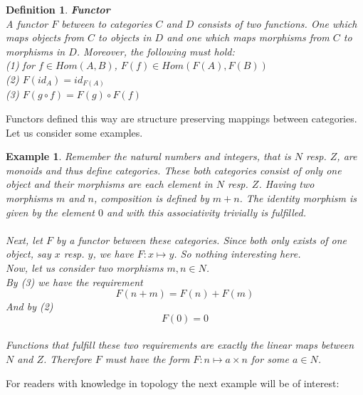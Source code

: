 \documentclass[17pt]{extarticle}
\newtheorem{example}{Example}
\newtheorem*{definition*}{Definition}
\begin{document}
\begin{definition*}
	\textbf{Functor}\\
	A functor $F$ between to categories $C$ and $D$ consists of two functions.
	One which maps objects from $C$ to objects in $D$ and one which maps morphisms from
	$C$ to morphisms in $D$. Moreover, the following must hold:\\
	(1) for $f\in Hom(A,B)$, $F(f)\in Hom(F(A), F(B))$\\
	(2) $F(id_A)=id_{F(A)}$\\
	(3) $F(g\circ f)=F(g)\circ F(f)$
\end{definition*}
\leavevmode\newline
Functors defined this way are structure preserving mappings between categories.
Let us consider some examples.\\

\begin{example}
	Remember the natural numbers and integers, that is $N$ resp. $Z$, are monoids and thus define categories. These both categories consist of only one object and their morphisms are each element in $N$ resp. $Z$. Having two morphisms $m$ and $n$, composition is defined by $m+n$. The identity morphism is given by the element $0$ and with this associativity trivially is fulfilled.\\ \\
	 
    Next, let $F$ by a functor between these categories. Since both only exists of one object, say $x$ resp. $y$, we have $F: x\mapsto y$. So nothing interesting here.\\
    
    Now, let us consider two morphisms $m,n\in N$.\\    
	By (3) we have the requirement
	$$F(n+m)=F(n)+F(m)$$
	And by (2)
	$$F(0)=0$$\\
	Functions that fulfill these two requirements are exactly the linear maps between $N$ and $Z$.
	Therefore $F$ must have the form $F:n\mapsto a\times n$ for some $a\in N$.
\end{example}
\leavevmode\newline
For readers with knowledge in topology the next example will be of interest:
\end{document}
